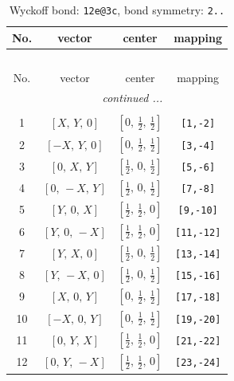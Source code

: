 \documentclass[fleqn,8pt]{jsarticle}
\begin{document}
\renewcommand{\arraystretch}{1.2}
\begin{longtable}{cccc}
\caption{Wyckoff bond: {\tt 12e@3c}, bond symmetry: {\tt 2..}}
 \\
 \hline \hline
No. & vector & center & mapping \\ \hline \endfirsthead

\multicolumn{3}{l}{\tablename\ \thetable{}} \\
 \hline \hline
No. & vector & center & mapping \\ \hline \endhead

 \hline \hline
\multicolumn{3}{r}{\footnotesize\it continued ...} \\ \endfoot

 \hline \hline
\multicolumn{3}{r}{} \\ \endlastfoot

1 & $\left[ X,\, Y,\, 0 \right]$ & $\left[ 0,\, \frac{1}{2},\, \frac{1}{2} \right]$ & {\tt [1,-2]} \\ \hline
2 & $\left[ - X,\, Y,\, 0 \right]$ & $\left[ 0,\, \frac{1}{2},\, \frac{1}{2} \right]$ & {\tt [3,-4]} \\ \hline
3 & $\left[ 0,\, X,\, Y \right]$ & $\left[ \frac{1}{2},\, 0,\, \frac{1}{2} \right]$ & {\tt [5,-6]} \\ \hline
4 & $\left[ 0,\, - X,\, Y \right]$ & $\left[ \frac{1}{2},\, 0,\, \frac{1}{2} \right]$ & {\tt [7,-8]} \\ \hline
5 & $\left[ Y,\, 0,\, X \right]$ & $\left[ \frac{1}{2},\, \frac{1}{2},\, 0 \right]$ & {\tt [9,-10]} \\ \hline
6 & $\left[ Y,\, 0,\, - X \right]$ & $\left[ \frac{1}{2},\, \frac{1}{2},\, 0 \right]$ & {\tt [11,-12]} \\ \hline
7 & $\left[ Y,\, X,\, 0 \right]$ & $\left[ \frac{1}{2},\, 0,\, \frac{1}{2} \right]$ & {\tt [13,-14]} \\ \hline
8 & $\left[ Y,\, - X,\, 0 \right]$ & $\left[ \frac{1}{2},\, 0,\, \frac{1}{2} \right]$ & {\tt [15,-16]} \\ \hline
9 & $\left[ X,\, 0,\, Y \right]$ & $\left[ 0,\, \frac{1}{2},\, \frac{1}{2} \right]$ & {\tt [17,-18]} \\ \hline
10 & $\left[ - X,\, 0,\, Y \right]$ & $\left[ 0,\, \frac{1}{2},\, \frac{1}{2} \right]$ & {\tt [19,-20]} \\ \hline
11 & $\left[ 0,\, Y,\, X \right]$ & $\left[ \frac{1}{2},\, \frac{1}{2},\, 0 \right]$ & {\tt [21,-22]} \\ \hline
12 & $\left[ 0,\, Y,\, - X \right]$ & $\left[ \frac{1}{2},\, \frac{1}{2},\, 0 \right]$ & {\tt [23,-24]} \\
\end{longtable}
\end{document}
